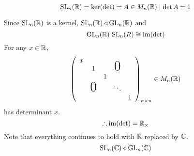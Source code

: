 \documentclass{article}
\begin{document}
\begin{defi}
    \[
        \mathrm{SL}_n(\mathbb{R}) = \ker(\det) = {A \in M_n(\mathbb{R}) \mid \det A = 1}  
    \]
\end{defi}
\begin{remark}
    Since $\mathrm{SL}_n(\mathbb{R})$ is a kernel, $\mathrm{SL}_n(\mathbb{R}) \triangleleft \mathrm{GL}_n(\mathbb{R})$ and
    \[
        \mathrm{GL}_n(\mathbb{R}) \ \mathrm{SL}_n(R) \cong \operatorname{im}(\det)
    \]
    For any $x \in \mathbb{R}$,
    \[
        \bkt{
            \begin{array}{ccccc}
                x                                                    \\
                  & 1                     &  & \smash{\text{\huge0}} \\
                  &                       & 1                        \\
                  & \smash{\text{\huge0}} &   & \ddots               \\
                  &                       &   &   & 1
            \end{array}
        }_{n \times n} \in M_n(\R)
    \]
    has determinant $x$.
    \[
        \therefore \operatorname{im}(\det) = \mathbb{R}_\times
    \]
    Note that everything continues to hold with $\mathbb{R}$ replaced by $\mathbb{C}$.
    \[
        \mathrm{SL}_n(\mathbb{C}) \triangleleft \mathrm{GL}_n(\mathbb{C})
    \]
\end{remark}

\end{document}
